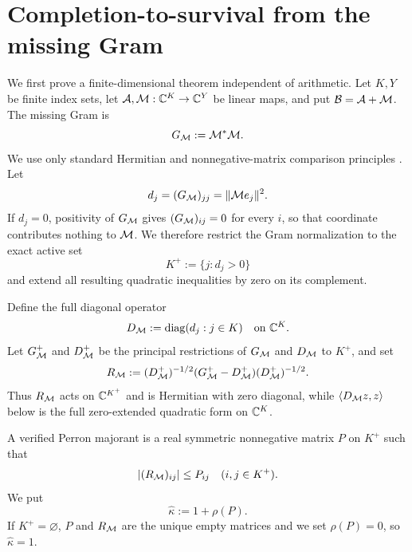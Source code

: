 \section{Completion-to-survival from the missing Gram}
\label{sec:completion-survival}

We first prove a finite-dimensional theorem independent of arithmetic.
Let \(K,Y\) be finite index sets, let
\(\mathcal A,\mathcal M:\mathbb C^K\to\mathbb C^Y\) be linear maps, and put
\(\mathcal B=\mathcal A+\mathcal M\).  The missing Gram is
\begin{equation}
 G_{\mathcal M}:=\mathcal M^*\mathcal M.
 \label{eq:missing-Gram}
\end{equation}
We use only standard Hermitian and nonnegative-matrix comparison
principles \citep{HornJohnson2013}.
Let
\[
 d_j=(G_{\mathcal M})_{jj}=\|\mathcal M e_j\|^2.
\]
If \(d_j=0\), positivity of \(G_{\mathcal M}\) gives
\((G_{\mathcal M})_{ij}=0\) for every \(i\), so that coordinate contributes
nothing to \(\mathcal M\).  We therefore restrict the Gram normalization to
the exact active set
\begin{equation}
 K^+:=\{j:d_j>0\}
 \label{eq:active-missing-set}
\end{equation}
and extend all resulting quadratic inequalities by zero on its
complement.

Define the full diagonal operator
\begin{equation}
 D_{\mathcal M}:=\operatorname{diag}(d_j:j\in K)
 \quad\text{on }\mathbb C^K.
 \label{eq:full-missing-diagonal}
\end{equation}
Let \(G_{\mathcal M}^+\) and \(D_{\mathcal M}^+\) be the principal restrictions of
\(G_{\mathcal M}\) and \(D_{\mathcal M}\) to \(K^+\), and set
\begin{equation}
 R_{\mathcal M}:=
 (D_{\mathcal M}^+)^{-1/2}
 (G_{\mathcal M}^+-D_{\mathcal M}^+)
 (D_{\mathcal M}^+)^{-1/2}.
 \label{eq:normalized-missing-Gram}
\end{equation}
Thus \(R_{\mathcal M}\) acts on \(\mathbb C^{K^+}\) and is Hermitian with zero
diagonal, while \(\langle D_{\mathcal M}z,z\rangle\) below is the full
zero-extended quadratic form on \(\mathbb C^K\).

\begin{definition}
\label{def:Perron-majorant}
A verified Perron majorant is a real symmetric nonnegative matrix
\(P\) on \(K^+\) such that
\begin{equation}
 |(R_{\mathcal M})_{ij}|\le P_{ij}
 \quad(i,j\in K^+).
 \label{eq:P-majorizes}
\end{equation}
We put
\begin{equation}
 \widehat\kappa:=1+\rho(P).
 \label{eq:kappa-hat}
\end{equation}
If \(K^+=\varnothing\), \(P\) and \(R_{\mathcal M}\) are the unique empty
matrices and we set \(\rho(P)=0\), so \(\widehat\kappa=1\).
\end{definition}

